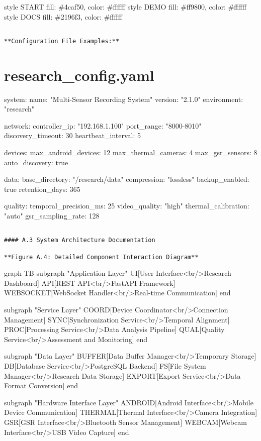 \documentclass[11pt,a4paper]{report}
\begin{document}
style START fill: \#4caf50, color: \#ffffff
style DEMO fill: \#ff9800, color: \#ffffff
style DOCS fill: \#2196f3, color: \#ffffff
\begin{verbatim}

**Configuration File Examples:**

\end{verbatim}
\section{research_config.yaml}
system:
  name: "Multi-Sensor Recording System"
  version: "2.1.0"
  environment: "research"

network:
  controller\_ip: "192.168.1.100"
  port\_range: "8000-8010"
  discovery\_timeout: 30
  heartbeat\_interval: 5

devices:
  max\_android\_devices: 12
  max\_thermal\_cameras: 4
  max\_gsr\_sensors: 8
  auto\_discovery: true

data:
  base\_directory: "/research/data"
  compression: "lossless"
  backup\_enabled: true
  retention\_days: 365

quality:
  temporal\_precision\_ms: 25
  video\_quality: "high"
  thermal\_calibration: "auto"
  gsr\_sampling\_rate: 128
\begin{verbatim}

#### A.3 System Architecture Documentation

**Figure A.4: Detailed Component Interaction Diagram**

\end{verbatim}
graph TB
    subgraph "Application Layer"
        UI[User Interface<br/>Research Dashboard]
        API[REST API<br/>FastAPI Framework]
        WEBSOCKET[WebSocket Handler<br/>Real-time Communication]
    end

    subgraph "Service Layer"
        COORD[Device Coordinator<br/>Connection Management]
        SYNC[Synchronization Service<br/>Temporal Alignment]
        PROC[Processing Service<br/>Data Analysis Pipeline]
        QUAL[Quality Service<br/>Assessment and Monitoring]
    end

    subgraph "Data Layer"
        BUFFER[Data Buffer Manager<br/>Temporary Storage]
        DB[Database Service<br/>PostgreSQL Backend]
        FS[File System Manager<br/>Research Data Storage]
        EXPORT[Export Service<br/>Data Format Conversion]
    end

    subgraph "Hardware Interface Layer"
        ANDROID[Android Interface<br/>Mobile Device Communication]
        THERMAL[Thermal Interface<br/>Camera Integration]
        GSR[GSR Interface<br/>Bluetooth Sensor Management]
        WEBCAM[Webcam Interface<br/>USB Video Capture]
    end
\end{document}
